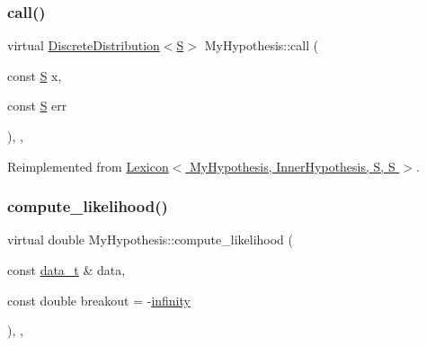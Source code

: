 \subsubsection{\texorpdfstring{call()}{call()}\hspace{0.1cm}{\footnotesize\ttfamily [2/2]}}
{\footnotesize\ttfamily virtual \hyperlink{class_discrete_distribution}{Discrete\+Distribution}$<$\hyperlink{_models_2_formal_language_theory-_complex_2main_8cpp_a51c40915539205f0b5add30b0d68a4cb}{S}$>$ My\+Hypothesis\+::call (\begin{DoxyParamCaption}\item[{const \hyperlink{_models_2_formal_language_theory-_complex_2main_8cpp_a51c40915539205f0b5add30b0d68a4cb}{S}}]{x,  }\item[{const \hyperlink{_models_2_formal_language_theory-_complex_2main_8cpp_a51c40915539205f0b5add30b0d68a4cb}{S}}]{err }\end{DoxyParamCaption})\hspace{0.3cm}{\ttfamily [inline]}, {\ttfamily [override]}, {\ttfamily [virtual]}}



Reimplemented from \hyperlink{class_lexicon_afc6b762f68c6033a501ce7ca04b01ece}{Lexicon$<$ My\+Hypothesis, Inner\+Hypothesis, S, S $>$}.

\mbox{\label{class_my_hypothesis_ad5cd40d67c9b6fb61311a5f4a08df426}} 
\subsubsection{\texorpdfstring{compute\+\_\+likelihood()}{compute\_likelihood()}\hspace{0.1cm}{\footnotesize\ttfamily [1/2]}}
{\footnotesize\ttfamily virtual double My\+Hypothesis\+::compute\+\_\+likelihood (\begin{DoxyParamCaption}\item[{const \hyperlink{class_bayesable_aa2788c4d7718c0a824e1d28c4c98f921}{data\+\_\+t} \&}]{data,  }\item[{const double}]{breakout = {\ttfamily -\/\hyperlink{_numerics_8h_a1bb1e42ae1b40cad6e99da0aab8a5576}{infinity}} }\end{DoxyParamCaption})\hspace{0.3cm}{\ttfamily [inline]}, {\ttfamily [override]}, {\ttfamily [virtual]}}



